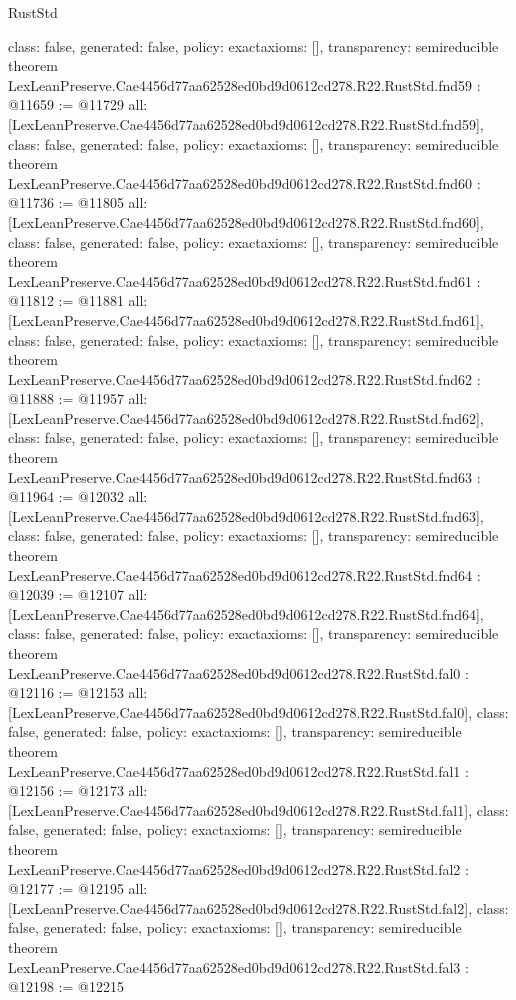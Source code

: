 \begin{lexlean}{RustStd}
\begin{coremodule}
{  class: false,
  generated: false,
  policy: exact{axioms: []},
  transparency: semireducible
}
theorem LexLeanPreserve.Cae4456d77aa62528ed0bd9d0612cd278.R22.RustStd.fnd59 : @11659 := @11729 {
  all: [LexLeanPreserve.Cae4456d77aa62528ed0bd9d0612cd278.R22.RustStd.fnd59],
  class: false,
  generated: false,
  policy: exact{axioms: []},
  transparency: semireducible
}
theorem LexLeanPreserve.Cae4456d77aa62528ed0bd9d0612cd278.R22.RustStd.fnd60 : @11736 := @11805 {
  all: [LexLeanPreserve.Cae4456d77aa62528ed0bd9d0612cd278.R22.RustStd.fnd60],
  class: false,
  generated: false,
  policy: exact{axioms: []},
  transparency: semireducible
}
theorem LexLeanPreserve.Cae4456d77aa62528ed0bd9d0612cd278.R22.RustStd.fnd61 : @11812 := @11881 {
  all: [LexLeanPreserve.Cae4456d77aa62528ed0bd9d0612cd278.R22.RustStd.fnd61],
  class: false,
  generated: false,
  policy: exact{axioms: []},
  transparency: semireducible
}
theorem LexLeanPreserve.Cae4456d77aa62528ed0bd9d0612cd278.R22.RustStd.fnd62 : @11888 := @11957 {
  all: [LexLeanPreserve.Cae4456d77aa62528ed0bd9d0612cd278.R22.RustStd.fnd62],
  class: false,
  generated: false,
  policy: exact{axioms: []},
  transparency: semireducible
}
theorem LexLeanPreserve.Cae4456d77aa62528ed0bd9d0612cd278.R22.RustStd.fnd63 : @11964 := @12032 {
  all: [LexLeanPreserve.Cae4456d77aa62528ed0bd9d0612cd278.R22.RustStd.fnd63],
  class: false,
  generated: false,
  policy: exact{axioms: []},
  transparency: semireducible
}
theorem LexLeanPreserve.Cae4456d77aa62528ed0bd9d0612cd278.R22.RustStd.fnd64 : @12039 := @12107 {
  all: [LexLeanPreserve.Cae4456d77aa62528ed0bd9d0612cd278.R22.RustStd.fnd64],
  class: false,
  generated: false,
  policy: exact{axioms: []},
  transparency: semireducible
}
theorem LexLeanPreserve.Cae4456d77aa62528ed0bd9d0612cd278.R22.RustStd.fal0 : @12116 := @12153 {
  all: [LexLeanPreserve.Cae4456d77aa62528ed0bd9d0612cd278.R22.RustStd.fal0],
  class: false,
  generated: false,
  policy: exact{axioms: []},
  transparency: semireducible
}
theorem LexLeanPreserve.Cae4456d77aa62528ed0bd9d0612cd278.R22.RustStd.fal1 : @12156 := @12173 {
  all: [LexLeanPreserve.Cae4456d77aa62528ed0bd9d0612cd278.R22.RustStd.fal1],
  class: false,
  generated: false,
  policy: exact{axioms: []},
  transparency: semireducible
}
theorem LexLeanPreserve.Cae4456d77aa62528ed0bd9d0612cd278.R22.RustStd.fal2 : @12177 := @12195 {
  all: [LexLeanPreserve.Cae4456d77aa62528ed0bd9d0612cd278.R22.RustStd.fal2],
  class: false,
  generated: false,
  policy: exact{axioms: []},
  transparency: semireducible
}
theorem LexLeanPreserve.Cae4456d77aa62528ed0bd9d0612cd278.R22.RustStd.fal3 : @12198 := @12215 {
}
\end{coremodule}
\end{lexlean}
